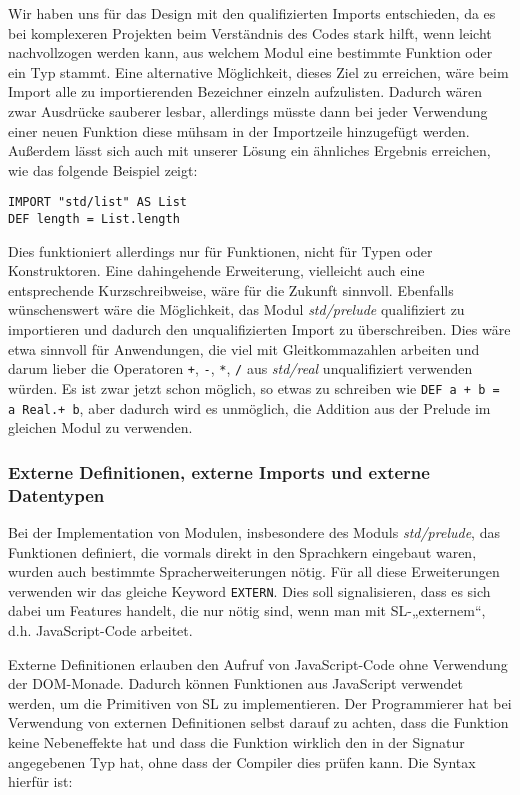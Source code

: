 \documentclass[runningheads]{llncs}
\begin{document}
Wir haben uns für das Design mit den qualifizierten Imports
entschieden, da es bei komplexeren Projekten beim Verständnis des
Codes stark hilft, wenn leicht nachvollzogen werden kann, aus welchem
Modul eine bestimmte Funktion oder ein Typ stammt.  Eine alternative
Möglichkeit, dieses Ziel zu erreichen, wäre beim Import alle zu
importierenden Bezeichner einzeln aufzulisten. Dadurch wären zwar
Ausdrücke sauberer lesbar, allerdings müsste dann bei jeder Verwendung
einer neuen Funktion diese mühsam in der Importzeile hinzugefügt
werden.  Außerdem lässt sich auch mit unserer Lösung ein ähnliches
Ergebnis erreichen, wie das folgende Beispiel zeigt:
\begin{verbatim}
IMPORT "std/list" AS List
DEF length = List.length
\end{verbatim}
Dies funktioniert allerdings nur für Funktionen, nicht für Typen oder
Konstruktoren.  Eine dahingehende Erweiterung, vielleicht auch eine
entsprechende Kurzschreibweise, wäre für die Zukunft sinnvoll.
Ebenfalls wünschenswert wäre die Möglichkeit, das Modul
\emph{std/prelude} qualifiziert zu importieren und dadurch den
unqualifizierten Import zu überschreiben.  Dies wäre etwa sinnvoll für
Anwendungen, die viel mit Gleitkommazahlen arbeiten und darum lieber
die Operatoren \verb|+|, \verb|-|, \verb|*|, \verb|/| aus
\emph{std/real} unqualifiziert verwenden würden. Es ist zwar jetzt
schon möglich, so etwas zu schreiben wie
\verb|DEF a + b = a Real.+ b|,
aber dadurch wird es unmöglich, die Addition aus der Prelude im
gleichen Modul zu verwenden.

\subsubsection{Externe Definitionen, externe Imports und externe
  Datentypen}
Bei der Implementation von Modulen, insbesondere des Moduls
\emph{std/prelude}, das Funktionen definiert, die vormals direkt in
den Sprachkern eingebaut waren, wurden auch bestimmte
Spracherweiterungen nötig.  Für all diese Erweiterungen verwenden wir
das gleiche Keyword \verb|EXTERN|.  Dies soll signalisieren, dass es
sich dabei um Features handelt, die nur nötig sind, wenn man mit
SL-„externem“, d.h. JavaScript-Code arbeitet.

Externe Definitionen erlauben den Aufruf von JavaScript-Code
ohne Verwendung der DOM-Monade. Dadurch können Funktionen aus
JavaScript verwendet werden, um die Primitiven von SL zu
implementieren.  Der Programmierer hat bei Verwendung von externen
Definitionen selbst darauf zu achten, dass die Funktion keine
Nebeneffekte hat und dass die Funktion wirklich den in der Signatur
angegebenen Typ hat, ohne dass der Compiler dies prüfen kann.
Die Syntax hierfür ist:
\end{document}
